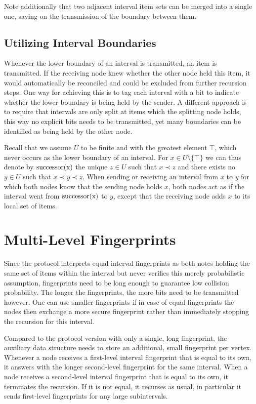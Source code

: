 Note additionally that two adjacent interval item sets can be merged into a single one, saving on the transmission of the boundary between them.

\subsection{Utilizing Interval Boundaries}

Whenever the lower boundary of an interval is transmitted, an item is transmitted. If the receiving node knew whether the other node held this item, it would automatically be reconciled and could be excluded from further recursion steps. One way for achieving this is to tag each interval with a bit to indicate whether the lower boundary is being held by the sender. A different approach is to require that intervals are only split at items which the splitting node holds, this way no explicit bits needs to be transmitted, yet many boundaries can be identified as being held by the other node.

Recall that we assume $U$ to be finite and with the greatest element $\top$, which never occurs as the lower boundary of an interval. For $x \in U \setminus \{\top\}$ we can thus denote by $\operatorname{successor({x})}$ the unique $z \in U$ such that $x \prec z$ and there exists no $y \in U$ such that $x \prec y \prec z$. When sending or receiving an interval from $x$ to $y$ for which both nodes know that the sending node holds $x$, both nodes act as if the interval went from $\operatorname{successor({x})}$ to $y$, except that the receiving node adds $x$ to its local set of items.

\section{Multi-Level Fingerprints}

Since the protocol interprets equal interval fingerprints as both notes holding the same set of items within the interval but never verifies this merely probabilistic assumption, fingerprints need to be long enough to guarantee low collision probability. The longer the fingerprints, the more bits need to be transmitted however. One can use smaller fingerprints if in case of equal fingerprints the nodes then exchange a more secure fingerprint rather than immediately stopping the recursion for this interval.

Compared to the protocol version with only a single, long fingerprint, the auxiliary data structure needs to store an additional, small fingerprint per vertex. Whenever a node receives a first-level interval fingerprint that is equal to its own, it answers with the longer second-level fingerprint for the same interval. When a node receives a second-level interval fingerprint that is equal to its own, it terminates the recursion. If it is not equal, it recurses as usual, in particular it sends first-level fingerprints for any large subintervals.

